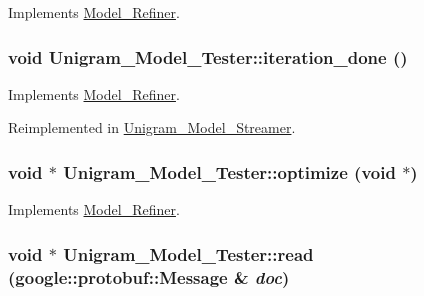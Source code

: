Implements \hyperlink{class_model___refiner_a6d3bb23a5d76951144004d61b2fdcbe7}{Model\_\-Refiner}.

\hypertarget{class_unigram___model___tester_a04021ed578bfeaa08a8956fc611c2722}{
\subsubsection[{iteration\_\-done}]{\setlength{\rightskip}{0pt plus 5cm}void Unigram\_\-Model\_\-Tester::iteration\_\-done ()}}
\label{class_unigram___model___tester_a04021ed578bfeaa08a8956fc611c2722}


Implements \hyperlink{class_model___refiner_a570c3bd6742f609ba86d724e8f070f1a}{Model\_\-Refiner}.



Reimplemented in \hyperlink{class_unigram___model___streamer_a60124013b5da9fabc486558801fa3ab4}{Unigram\_\-Model\_\-Streamer}.

\hypertarget{class_unigram___model___tester_a1f1c50061c974325ec32810e27428d08}{
\subsubsection[{optimize}]{\setlength{\rightskip}{0pt plus 5cm}void $\ast$ Unigram\_\-Model\_\-Tester::optimize (void $\ast$)}}
\label{class_unigram___model___tester_a1f1c50061c974325ec32810e27428d08}


Implements \hyperlink{class_model___refiner_a238a8d648f8b1c0966ea8e4cbbaa9e9e}{Model\_\-Refiner}.

\hypertarget{class_unigram___model___tester_a3d6b3c06e90df22b72bbd979eedef78e}{
\subsubsection[{read}]{\setlength{\rightskip}{0pt plus 5cm}void $\ast$ Unigram\_\-Model\_\-Tester::read (google::protobuf::Message \& {\em doc})}}
\label{class_unigram___model___tester_a3d6b3c06e90df22b72bbd979eedef78e}


